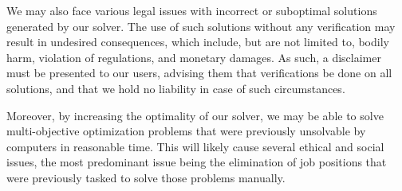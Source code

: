 \documentclass[11pt]{article}
\begin{document}
We may also face various legal issues with incorrect or suboptimal
solutions generated by our solver. The use of such solutions without
any verification may result in undesired consequences, which include,
but are not limited to, bodily harm, violation of regulations, and
monetary damages. As such, a disclaimer must be presented to our
users, advising them that verifications be done on all solutions,
and that we hold no liability in case of such circumstances.

Moreover, by increasing the optimality of our solver, we may be able to
solve multi-objective optimization problems that were previously
unsolvable by computers in reasonable time. This will likely cause
several ethical and social issues, the most predominant issue being the
elimination of job positions that were previously tasked to solve those
problems manually.

\printbibliography[heading=bibintoc]
\end{document}
